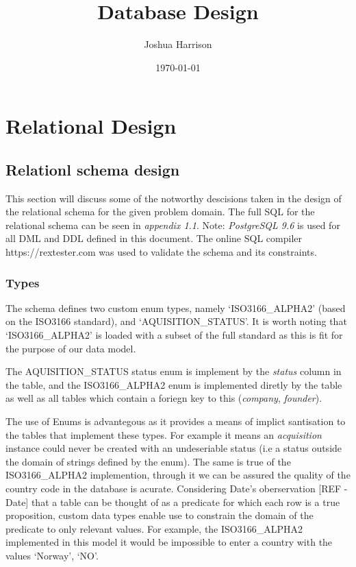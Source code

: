 \documentclass[12pt]{article}
\title{Database Design}
\author{Joshua Harrison}
\date{\today}
\begin{document}
\maketitle

\section{Relational Design}

\subsection{Relationl schema design}
This section will discuss some of the notworthy descisions taken in the design of the relational schema for the given problem domain.
The full SQL for the relational schema can be seen in \emph{appendix 1.1}. Note: \emph{PostgreSQL 9.6} is used for all DML and DDL defined in this document. The online SQL compiler https://rextester.com was used to validate the schema and its constraints.

\subsubsection{Types}
The schema defines two custom enum types, namely  `ISO3166\_ALPHA2' (based on the ISO3166 standard), and `AQUISITION\_STATUS'. It is worth noting that `ISO3166\_ALPHA2' is loaded with a subset of the full standard as this is fit for the purpose of our data model.

The AQUISITION\_STATUS status enum is implement by the \emph{status} column in the  table, and the ISO3166\_ALPHA2 enum is implemented diretly by the  table as well as all tables which contain a foriegn key to this (\emph{company}, \emph{founder}).

The use of Enums is advantegous as it provides a means of implict santisation to the tables that implement these types. For example it means an \emph{acquisition} instance could never be created with an undeseriable status (i.e a status outside the domain of strings defined by the enum). The same is true of the ISO3166\_ALPHA2 implemention, through it we can be assured the quality of the country code in the database is acurate. Considering Date's  oberservation [REF - Date] that a table can be thought of as a predicate for which each row is a true proposition, custom data types enable use to constrain the domain of the predicate to only relevant values. For example, the ISO3166\_ALPHA2 implemented in this model it would be impossible to enter a country with the values `Norway', `NO'.
\end{document}
